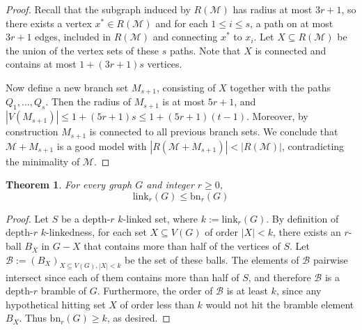 \documentclass[final]{dmtcs-episciences}
\newtheorem{thm}{Theorem}
\theoremstyle{definition}
\theoremstyle{remark}
\newcommand{\dep}{depth}
\newcommand{\bn}{\ensuremath{\mathrm{bn}}}
\newcommand{\link}{\ensuremath{\mathrm{link}}}
\renewcommand{\le}{\leqslant}
\renewcommand{\leq}{\leqslant}
\renewcommand{\geq}{\geqslant}
\begin{document}
\begin{proof}
Recall that the subgraph induced by $R(\mathcal{M})$ has radius at most $3r+1$, so there exists a vertex $x^*\in R(\mathcal{M})$ and for each $1\le i \le s$, a path on at most $3r+1$ edges, included in $R(\mathcal{M})$ and connecting $x^*$ to  $x_i$. Let $X\subseteq R(\mathcal{M})$ be the union of the vertex sets of these $s$ paths. Note that $X$ is connected and contains at most $1+(3r+1)s$ vertices. 

Now define a new branch set $M_{s+1}$, consisting of $X$ together with the paths $Q_1,\ldots, Q_s$. Then the radius of $M_{s+1}$ is at most $5r+1$, and $|V(M_{s+1})|\leq 1+(5r+1)s\le 1+(5r+1)(t-1)$. 
Moreover, by construction $M_{s+1}$ is connected to all previous branch sets. We conclude that $\mathcal{M}+M_{s+1}$ is a good model with $|R(\mathcal{M}+M_{s+1})|<|R(\mathcal{M})|$, contradicting the minimality of $\mathcal{M}$.
\end{proof}



\begin{thm}
For every graph $G$ and integer $r\geq 0$,
$$\link_r(G) \leq \bn_r(G)$$
\end{thm}
\begin{proof}
Let $S$ be a \dep-$r$ $k$-linked set, where $k:=\link_r(G)$.
By definition of \dep-$r$ $k$-linkedness, for each set $X\subseteq V(G)$ of order $|X|<k$, there exists an $r$-ball $B_X$ in $G-X$ that contains more than half of the vertices of $S$. Let $\mathcal{B}:=(B_X)_{X \subseteq V(G), |X|<k}$ be the set of these balls. The elements of $\mathcal{B}$ pairwise intersect since each of them contains more than half of $S$, and therefore $\mathcal{B}$ is a \dep-$r$ bramble of $G$. 
Furthermore, the order of $\mathcal{B}$ is at least $k$, since any hypothetical hitting set $X$ of order less than $k$ would not hit the bramble element $B_{X}$. Thus $\bn_r(G) \geq k$, as desired.
\end{proof}
\end{document}
